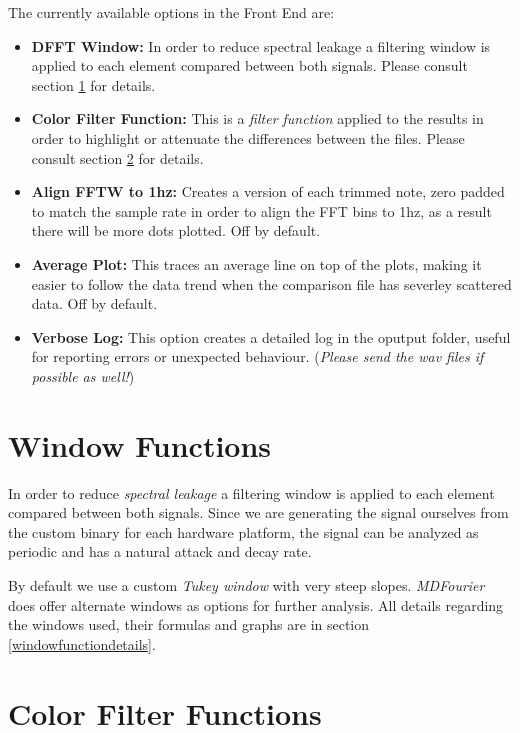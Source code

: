 \documentclass[10pt,a4paper]{report}
\begin{document}
The currently available options in the Front End are:

\begin{itemize}
	\item \textbf{DFFT Window:} In order to reduce spectral leakage a filtering window is applied to each element compared between both signals. Please consult section \ref{windows} for details. 
	\item \textbf{Color Filter Function:} This is a \textit{filter function} applied to the results in order to highlight or attenuate the differences between the files.  Please consult section \ref{colorfilter} for details. 
	\item \textbf{Align FFTW to 1hz:} Creates a version of each trimmed note, zero padded to match the sample rate in order to align the FFT bins to 1hz, as a  result there will be more dots plotted. Off by default.
	\item \textbf{Average Plot:} This traces an average line on top of the plots, making it easier to follow the data trend when the comparison file has severley scattered data. Off by default.
	\item \textbf{Verbose Log:} This option creates a detailed log in the oputput folder, useful for reporting errors or unexpected behaviour. (\textit{Please send the wav files if possible as well!})
\end{itemize}

\section{Window Functions}
\label{windows}

In order to reduce \textit{spectral leakage} a filtering window is applied to each element compared between both signals. Since we are generating the signal ourselves from the custom binary for each hardware platform, the signal can be analyzed as periodic and has a natural attack and decay rate.

By default we use a custom \textit{Tukey window} with very steep slopes. \textit{MDFourier} does offer alternate windows as options for further analysis. All details regarding the windows used, their formulas and graphs are in section \ref{windowfunctiondetails}.

\section{Color Filter Functions}
\label{colorfilter}
\end{document}
